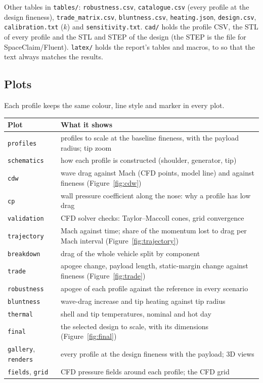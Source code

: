 \noindent Other tables in \texttt{tables/}: \texttt{robustness.csv}, \texttt{catalogue.csv} (every profile at the
design fineness), \texttt{trade\_matrix.csv}, \texttt{bluntness.csv}, \texttt{heating.json}, \texttt{design.csv},
\texttt{calibration.txt} ($k$) and \texttt{sensitivity.txt}. \texttt{cad/} holds the profile CSV, the STL of every
profile and the STL and STEP of the design (the STEP is the file for SpaceClaim/Fluent). \texttt{latex/} holds the
report's tables and macros, to \verb|| so that the text always matches the results.

\subsection{Plots}
\label{sec:plots}

Each profile keeps the same colour, line style and marker in every plot.

\begin{table}[H]
\centering
\footnotesize
\begin{tabular}{@{}>{\raggedright\arraybackslash}p{2.4cm}>{\raggedright\arraybackslash}p{13.6cm}@{}}
\toprule
Plot & What it shows \\
\midrule
\texttt{profiles} & profiles to scale at the baseline fineness, with the payload radius; tip zoom \\
\texttt{schematics} & how each profile is constructed (shoulder, generator, tip) \\
\texttt{cdw} & wave drag against Mach (CFD points, model line) and against fineness (Figure~\ref{fig:cdw}) \\
\texttt{cp} & wall pressure coefficient along the nose: why a profile has low drag \\
\texttt{validation} & CFD solver checks: Taylor--Maccoll cones, grid convergence \\
\texttt{trajectory} & Mach against time; share of the momentum lost to drag per Mach interval (Figure~\ref{fig:trajectory}) \\
\texttt{breakdown} & drag of the whole vehicle split by component \\
\texttt{trade} & apogee change, payload length, static-margin change against fineness (Figure~\ref{fig:trade}) \\
\texttt{robustness} & apogee of each profile against the reference in every scenario \\
\texttt{bluntness} & wave-drag increase and tip heating against tip radius \\
\texttt{thermal} & shell and tip temperatures, nominal and hot day \\
\texttt{final} & the selected design to scale, with its dimensions (Figure~\ref{fig:final}) \\
\texttt{gallery}, \texttt{renders} & every profile at the design fineness with the payload; 3D views \\
\texttt{fields}, \texttt{grid} & CFD pressure fields around each profile; the CFD grid \\
\bottomrule
\end{tabular}
\end{table}

